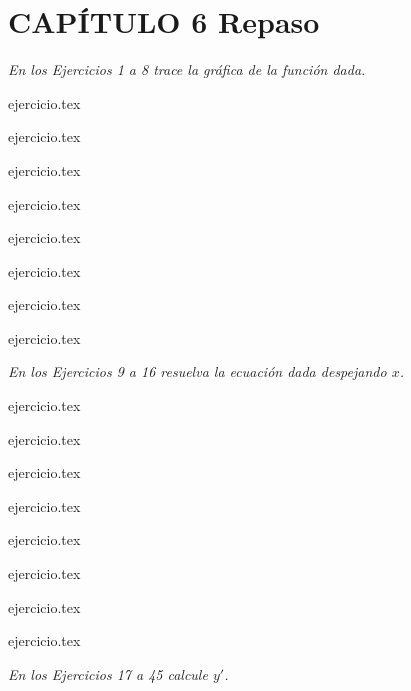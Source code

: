 
\section*{CAPÍTULO 6 \quad Repaso}

\noindent \textit{En los Ejercicios 1 a 8 trace la gráfica de la función dada.}

\begin{enumerate}
    \begin{minipage}{0.45\textwidth}
    {ejercicio.tex}
\addtocounter{enumi}{1}
    {ejercicio.tex}
\addtocounter{enumi}{1}
    {ejercicio.tex}
\addtocounter{enumi}{1}
    {ejercicio.tex}
\end{minipage}%
    \begin{minipage}{0.45\textwidth}
    \setcounter{enumi}{1}
    {ejercicio.tex}
\addtocounter{enumi}{1}
    {ejercicio.tex}
\addtocounter{enumi}{1}
    {ejercicio.tex}
\addtocounter{enumi}{1}
    {ejercicio.tex}
\end{minipage}
\end{enumerate}

\vspace{1em}
\noindent \textit{En los Ejercicios 9 a 16 resuelva la ecuación dada despejando $x$.}

\begin{enumerate}
    \setcounter{enumi}{8}
    \begin{minipage}{0.45\textwidth}
    {ejercicio.tex}
\addtocounter{enumi}{1}
    {ejercicio.tex}
\addtocounter{enumi}{1}
    {ejercicio.tex}
\addtocounter{enumi}{1}
    {ejercicio.tex}
\end{minipage}%
    \begin{minipage}{0.45\textwidth}
    \setcounter{enumi}{9}
    {ejercicio.tex}
\addtocounter{enumi}{1}
    {ejercicio.tex}
\addtocounter{enumi}{1}
    {ejercicio.tex}
\addtocounter{enumi}{1}
    {ejercicio.tex}
\end{minipage}
\end{enumerate}

\vspace{1em}
\noindent \textit{En los Ejercicios 17 a 45 calcule $y'$.}

